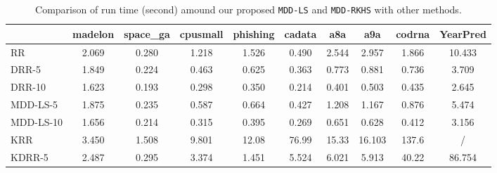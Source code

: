 \documentclass{article}
\begin{document}
\begin{table*}[t]
\small
\footnotesize
   \caption{
    \small Comparison of run time (second) amound our proposed \texttt{MDD-LS} and \texttt{MDD-RKHS} with other methods.
   }
   \label{tabel:time}
    \begin{tabular*}{\linewidth}{@{\extracolsep{-0.10cm}}lccccccccc}
    \toprule
                                &madelon                  &space\_ga               &cpusmall            &phishing           &cadata             &a8a                  &a9a                    &cod\-rna                   &YearPred                \\   \hline
RR                              &2.069                    &0.280                   &1.218               &1.526              &0.490              &2.544                &2.957                  &1.866                      &10.433 \\
DRR-5                           &1.849                    &0.224                   &0.463               &0.625              &0.363              &0.773                &0.881                  &0.736                      &3.709 \\
DRR-10                          &1.623                    &0.193                   &0.298               &0.350              &0.214              &0.401                &0.503                  &0.435                      &2.645 \\
MDD-LS-5                        &1.875                    &0.235                   &0.587               &0.664              &0.427              &1.208                &1.167                  &0.876                      &5.474 \\
MDD-LS-10                       &1.656                    &0.214                   &0.315               &0.395              &0.269              &0.651                &0.628                  &0.412                      &3.156 \\
\hline \hline
KRR                             &3.450                    &1.508                   &9.801               &12.08              &76.99              &15.33                &16.103                 &137.6                      &/ \\
KDRR-5                          &2.487                    &0.295                   &3.374               &1.451              &5.524              &6.021                &5.913                  &40.22                      &86.754\\

\end{tabular*}
\end{table*}
\end{document}
